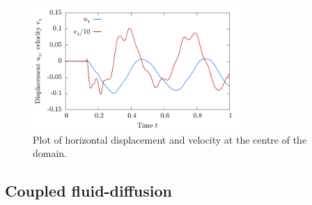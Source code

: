 \documentclass[a4paper,DIV=12,10pt]{scrartcl}
\begin{document}
\begin{figure}[htbp]
  \centering
  \includegraphics[width=0.7\textwidth]{dynamic}
  \caption{Plot of horizontal displacement and velocity at the centre
    of the domain.}
  \label{fig:dynamic}
\end{figure}

\newpage
\subsection{Coupled fluid-diffusion}
\label{sec:fluid}
\end{document}
